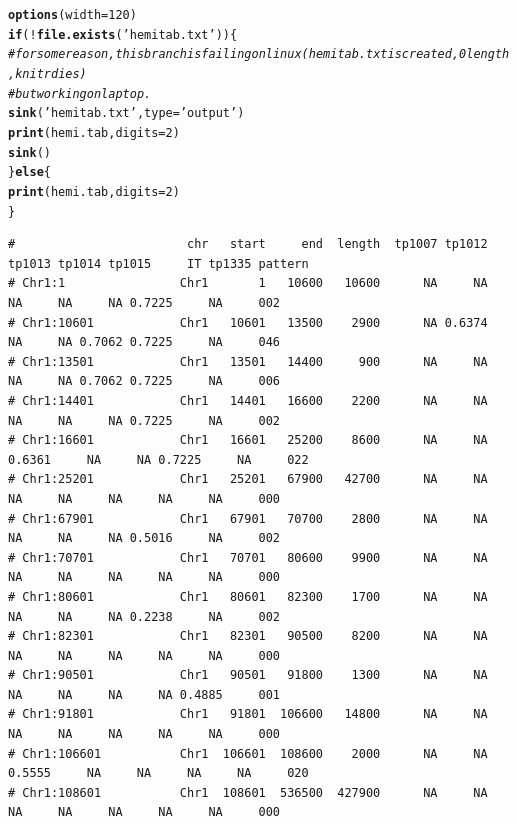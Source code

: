 \documentclass{article}\usepackage[]{graphicx}\usepackage[]{color}
\makeatletter
\newcommand{\hlnum}[1]{\textcolor[rgb]{0.686,0.059,0.569}{#1}}%
\newcommand{\hlstr}[1]{\textcolor[rgb]{0.192,0.494,0.8}{#1}}%
\newcommand{\hlcom}[1]{\textcolor[rgb]{0.678,0.584,0.686}{\textit{#1}}}%
\newcommand{\hlopt}[1]{\textcolor[rgb]{0,0,0}{#1}}%
\newcommand{\hlstd}[1]{\textcolor[rgb]{0.345,0.345,0.345}{#1}}%
\newcommand{\hlkwa}[1]{\textcolor[rgb]{0.161,0.373,0.58}{\textbf{#1}}}%
\newcommand{\hlkwc}[1]{\textcolor[rgb]{0.333,0.667,0.333}{#1}}%
\newcommand{\hlkwd}[1]{\textcolor[rgb]{0.737,0.353,0.396}{\textbf{#1}}}%
\newenvironment{kframe}{%
 \def\at@end@of@kframe{}%
 \ifinner\ifhmode%
  \def\at@end@of@kframe{\end{minipage}}%
  \begin{minipage}{\columnwidth}%
 \fi\fi%
 \def\FrameCommand##1{\hskip\@totalleftmargin \hskip-\fboxsep
 \colorbox{shadecolor}{##1}\hskip-\fboxsep
     \hskip-\linewidth \hskip-\@totalleftmargin \hskip\columnwidth}%
 \MakeFramed {\advance\hsize-\width
   \@totalleftmargin\z@ \linewidth\hsize
   \@setminipage}}%
 {\par\unskip\endMakeFramed%
 \at@end@of@kframe}
\newenvironment{knitrout}{}{} %
\makeatother
\begin{document}
\begin{knitrout}\scriptsize
{}\color{fgcolor}\begin{kframe}
\begin{alltt}
\hlkwd{options}\hlstd{(}\hlkwc{width}\hlstd{=}\hlnum{120}\hlstd{)}
\hlkwa{if}\hlstd{(}\hlopt{!}\hlkwd{file.exists}\hlstd{(}\hlstr{'hemitab.txt'}\hlstd{))\{}
  \hlcom{# for some reason, this branch is failing on linux (hemitab.txt is created, 0 length, knitr dies)}
  \hlcom{# but working on laptop. }
  \hlkwd{sink}\hlstd{(}\hlstr{'hemitab.txt'}\hlstd{,} \hlkwc{type}\hlstd{=}\hlstr{'output'}\hlstd{)}
  \hlkwd{print}\hlstd{(hemi.tab,}\hlkwc{digits}\hlstd{=}\hlnum{2}\hlstd{)}
  \hlkwd{sink}\hlstd{()}
\hlstd{\}} \hlkwa{else} \hlstd{\{}
  \hlkwd{print}\hlstd{(hemi.tab,}\hlkwc{digits}\hlstd{=}\hlnum{2}\hlstd{)}
\hlstd{\}}
\end{alltt}
\begin{verbatim}
#                        chr   start     end  length  tp1007 tp1012 tp1013 tp1014 tp1015     IT tp1335 pattern
# Chr1:1                Chr1       1   10600   10600      NA     NA     NA     NA     NA 0.7225     NA     002
# Chr1:10601            Chr1   10601   13500    2900      NA 0.6374     NA     NA 0.7062 0.7225     NA     046
# Chr1:13501            Chr1   13501   14400     900      NA     NA     NA     NA 0.7062 0.7225     NA     006
# Chr1:14401            Chr1   14401   16600    2200      NA     NA     NA     NA     NA 0.7225     NA     002
# Chr1:16601            Chr1   16601   25200    8600      NA     NA 0.6361     NA     NA 0.7225     NA     022
# Chr1:25201            Chr1   25201   67900   42700      NA     NA     NA     NA     NA     NA     NA     000
# Chr1:67901            Chr1   67901   70700    2800      NA     NA     NA     NA     NA 0.5016     NA     002
# Chr1:70701            Chr1   70701   80600    9900      NA     NA     NA     NA     NA     NA     NA     000
# Chr1:80601            Chr1   80601   82300    1700      NA     NA     NA     NA     NA 0.2238     NA     002
# Chr1:82301            Chr1   82301   90500    8200      NA     NA     NA     NA     NA     NA     NA     000
# Chr1:90501            Chr1   90501   91800    1300      NA     NA     NA     NA     NA     NA 0.4885     001
# Chr1:91801            Chr1   91801  106600   14800      NA     NA     NA     NA     NA     NA     NA     000
# Chr1:106601           Chr1  106601  108600    2000      NA     NA 0.5555     NA     NA     NA     NA     020
# Chr1:108601           Chr1  108601  536500  427900      NA     NA     NA     NA     NA     NA     NA     000

\end{verbatim}
\end{kframe}
\end{knitrout}
\end{document}
